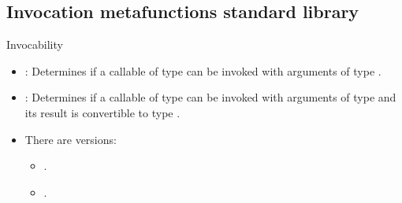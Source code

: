 \subsection{Invocation metafunctions standard library}

\begin{frame}[t,fragile]{Invocability}
\begin{itemize}
  \item {}:
        Determines if a callable of type  can be invoked with arguments of type .

  \item {}:
        Determines if a callable of type  can be invoked with arguments of type 
        and its result is convertible to type .
        

  \item There are  versions:
    \begin{itemize}
      \item {}.
      \item {}.
    \end{itemize}
\end{itemize}
\end{frame}
